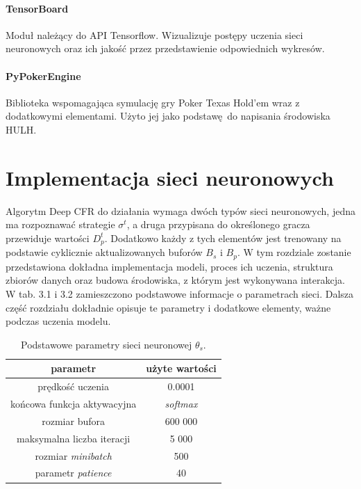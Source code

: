 \documentclass[12pt,oneside,a4paper]{report}
\begin{document}
\paragraph{TensorBoard}
Moduł należący do API Tensorflow. Wizualizuje postępy uczenia sieci neuronowych oraz ich 
jakość przez przedstawienie odpowiednich wykresów. 


\paragraph{PyPokerEngine}

Biblioteka wspomagająca symulację gry Poker Texas Hold'em wraz z dodatkowymi elementami.
Użyto jej jako podstawę do napisania środowiska HULH.

\section{Implementacja sieci neuronowych}

Algorytm Deep CFR do działania wymaga dwóch typów sieci neuronowych, jedna ma rozpoznawać strategie
$\sigma^{t}$, a
druga przypisana do określonego gracza przewiduje wartości $D_{p}^{t}$. 
Dodatkowo każdy z tych elementów
jest trenowany na podstawie cyklicznie aktualizowanych buforów $B_{s}$ i $B_{p}$. W tym rozdziale zostanie
przedstawiona dokładna implementacja modeli, proces ich uczenia, struktura zbiorów danych oraz
budowa środowiska, z którym jest wykonywana interakcja. W tab. 3.1 i 3.2 zamieszczono podstawowe 
informacje
o parametrach sieci. Dalsza część rozdziału dokładnie opisuje te parametry i dodatkowe elementy, ważne podczas
uczenia modelu.

\vspace{1cm}
\begin{table}[h!]
\centering
\caption{Podstawowe parametry sieci neuronowej $\theta_{s}$.}
\begin{tabular}{|c|c| }
   \hline
   parametr & użyte wartości \\
    \hline
   prędkość uczenia & 0.0001 \\
   \hline
   końcowa funkcja aktywacyjna & \emph{softmax} \\
   \hline
   rozmiar bufora & 600 000 \\
   \hline
   maksymalna liczba iteracji & 5 000 \\
   \hline
   rozmiar \emph{minibatch} &  500\\
   \hline
   parametr \emph{patience} &  40\\
   \hline
\end{tabular}
\end{table}
\end{document}
